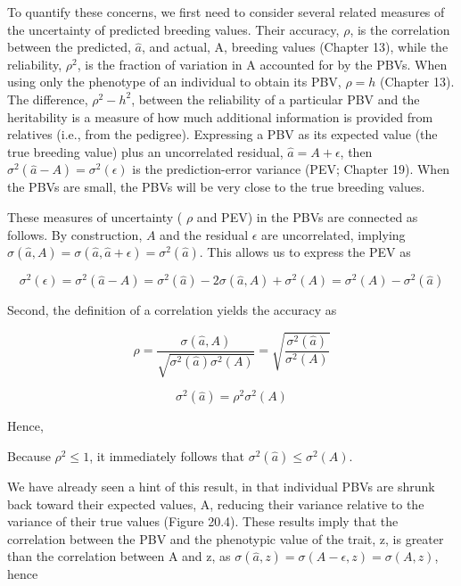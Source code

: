 \documentclass{article}
\begin{document}
To quantify these concerns, we first need to consider several related measures of the uncertainty of predicted breeding values. Their accuracy,  $ \rho $, is the correlation between the predicted,  $ \widehat{a} $, and actual, A, breeding values (Chapter 13), while the reliability,  $ \rho^2 $, is the fraction of variation in A accounted for by the PBVs. When using only the phenotype of an individual to obtain its PBV,  $ \rho = h $ (Chapter 13). The difference,  $ \rho^2 - h^2 $, between the reliability of a particular PBV and the heritability is a measure of how much additional information is provided from relatives (i.e., from the pedigree). Expressing a PBV as its expected value (the true breeding value) plus an uncorrelated residual,  $ \widehat{a} = A + \epsilon $, then  $ \sigma^2(\widehat{a} - A) = \sigma^2(\epsilon) $ is the prediction-error variance (PEV; Chapter 19). When the PBVs are small, the PBVs will be very close to the true breeding values.

These measures of uncertainty ( $ \rho $ and PEV) in the PBVs are connected as follows. By construction,  $ A $ and the residual  $ \epsilon $ are uncorrelated, implying  $ \sigma(\widehat{a}, A) = \sigma(\widehat{a}, \widehat{a} + \epsilon) = \sigma^2(\widehat{a}) $. This allows us to express the PEV as

\begin{equation}
\sigma^{2}(\epsilon)=\sigma^{2}(\widehat{a}-A)=\sigma^{2}(\widehat{a})-2\sigma(\widehat{a},A)+\sigma^{2}(A)=\sigma^{2}(A)-\sigma^{2}(\widehat{a})
\tag{20.24a}
\label{eq:20_24a}
\end{equation}

Second, the definition of a correlation yields the accuracy as

\begin{equation}
\rho=\frac{\sigma(\widehat{a},A)}{\sqrt{\sigma^{2}(\widehat{a})\sigma^{2}(A)}}=\sqrt{\frac{\sigma^{2}(\widehat{a})}{\sigma^{2}(A)}}
\tag{20.24b}
\label{eq:20_24b}
\end{equation}

\begin{equation}
\sigma^{2}(\widehat{a})=\rho^{2}\sigma^{2}(A)
\tag{20.24c}
\label{eq:20_24c}
\end{equation}

Hence,

Because  $ \rho^2 \leq 1 $, it immediately follows that  $ \sigma^2(\widehat{a}) \leq \sigma^2(A) $.

We have already seen a hint of this result, in that individual PBVs are shrunk back toward their expected values, A, reducing their variance relative to the variance of their true values (Figure 20.4). These results imply that the correlation between the PBV and the phenotypic value of the trait, z, is greater than the correlation between A and z, as  $ \sigma(\widehat{a}, z) = \sigma(A - \epsilon, z) = \sigma(A, z) $, hence
\end{document}
